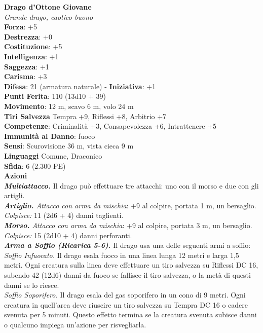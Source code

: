 \begin{multicols}{2}
\medskip\textbf{Drago d'Ottone Giovane}\\
\emph{Grande drago, caotico buono}\\
\textbf{Forza}: +5\\
\textbf{Destrezza}: +0\\
\textbf{Costituzione}: +5\\
\textbf{Intelligenza}: +1\\
\textbf{Saggezza}: +1\\
\textbf{Carisma}: +3\\
\textbf{Difesa}: 21 (armatura naturale) - \textbf{Iniziativa}: +1\\
\textbf{Punti Ferita}: 110 (13d10 + 39)\\
\textbf{Movimento}: 12 m, scavo 6 m, volo 24 m\\
\textbf{Tiri Salvezza} Tempra +9, Riflessi +8, Arbitrio +7\\
\textbf{Competenze}: Criminalità +3, Consapevolezza +6, Intrattenere +5\\
\textbf{Immunità al Danno}: fuoco\\
\textbf{Sensi}: Scurovisione 36 m, vista cieca 9 m\\
\textbf{Linguaggi} Comune, Draconico\\
\textbf{Sfida}: 6 (2.300 PE)\smallskip\\
\smallskip\textbf{Azioni}\\
\emph{\textbf{Multiattacco.}} Il drago può effettuare tre attacchi: uno con il morso e due con gli artigli.\\
\emph{\textbf{Artiglio.} Attacco con arma da mischia}: +9 al colpire, portata 1 m, un bersaglio.\\
\emph{Colpisce:} 11 (2d6 + 4) danni taglienti.\\
\emph{\textbf{Morso.} Attacco con arma da mischia}: +9 al colpire, portata 3 m, un bersaglio.\\
\emph{Colpisce:} 15 (2d10 + 4) danni perforanti.\\
\emph{\textbf{Arma a Soffio (Ricarica 5-6).}} Il drago usa una delle seguenti armi a soffio:\\
\emph{Soffio Infuocato.} Il drago esala fuoco in una linea lunga 12 metri e larga 1,5 metri. Ogni creatura sulla linea deve effettuare un tiro salvezza su Riflessi DC  16, subendo 42 (12d6) danni da fuoco se fallisce il tiro salvezza, o la metà di questi danni se lo riesce.\\
\emph{Soffio Soporifero.} Il drago esala del gas soporifero in un cono di 9 metri. Ogni creatura in quell'area deve riuscire un tiro salvezza su Tempra DC  16 o cadere svenuta per 5 minuti. Questo effetto termina se la creatura svenuta subisce danni o qualcuno impiega un'azione per risvegliarla.\\

\end{multicols}
